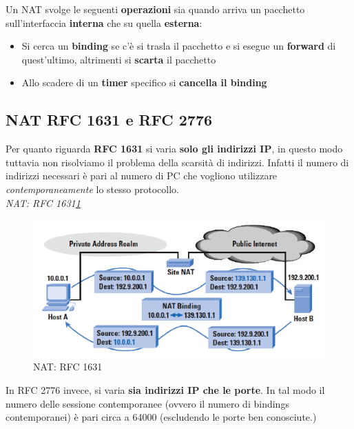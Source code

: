 \documentclass[12pt]{article}
\begin{document}
			Un NAT svolge le seguenti \textbf{operazioni} sia quando arriva un pacchetto sull'interfaccia \textbf{interna} che su quella \textbf{esterna}:
			\begin{itemize}
				\item Si cerca un \textbf{binding} se c'è si trasla il pacchetto e si esegue un \textbf{forward} di quest'ultimo, altrimenti si \textbf{scarta} il pacchetto
				\item Allo scadere di un \textbf{timer} specifico si \textbf{cancella il binding}
			\end{itemize}
		\subsection{NAT RFC 1631 e RFC 2776 }  
			Per quanto riguarda \textbf{RFC 1631} si varia \textbf{solo gli indirizzi IP}, in questo modo tuttavia non risolviamo il problema della scarsità di indirizzi. Infatti il numero di indirizzi necessari è pari al numero di PC che vogliono utilizzare \textit{contemporaneamente} lo stesso protocollo.\\
			\textit{NAT: RFC 1631\ref{fig:7}}\\
			\begin{figure}[h!]
				\centering
				\includegraphics[scale=0.60]{img/1631.PNG}
				\caption{NAT: RFC 1631\label{fig:7}}
			\end{figure}
			
			In RFC 2776 invece, si varia \textbf{sia indirizzi IP che le porte}. In tal modo il numero delle sessione contemporanee (ovvero il numero di bindings contemporanei) è pari circa a 64000 (escludendo le porte ben conosciute.)
\end{document}

